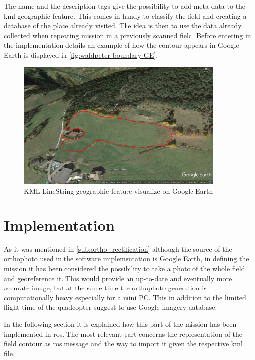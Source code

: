 The \textsf{name} and the \textsf{description} tags give the possibility to add meta-data to the \acrshort{kml} geographic feature. This comes in handy to classify the field and creating a database of the place already visited. The idea is then to use the data already collected when repeating mission in a previously scanned field.
Before entering in the implementation details an example of how the contour appears in Google Earth is displayed in \autoref{fig:waldpeter-boundary-GE}.
\begin{figure}[ht]
    \centering
    \includegraphics[width=0.9\textwidth]{figures/C2/waldpeter-boundary-GE.png}
    \caption{KML LineString geographic feature visualize on Google Earth}
    \label{fig:waldpeter-boundary-GE}
\end{figure}

\section{Implementation} %
\label{sec:implementation}
As it was mentioned in \ref{sub:ortho_rectification} although the source of the orthophoto used in the software implementation is Google Earth, in defining the mission it has been considered the possibility to take a photo of the whole field and georeference it. This would provide an up-to-date and eventually more accurate image, but at the same time the orthophoto generation is computationally heavy especially for a mini PC. This in addition to the limited flight time of the quadcopter suggest to use Google imagery database.\par
In the following section it is explained how this part of the mission has been implemented in \acrshort{ros}. The most relevant part concerns the representation of the field contour as \acrshort{ros} message and the way to import it given the respective \acrshort{kml} file.

